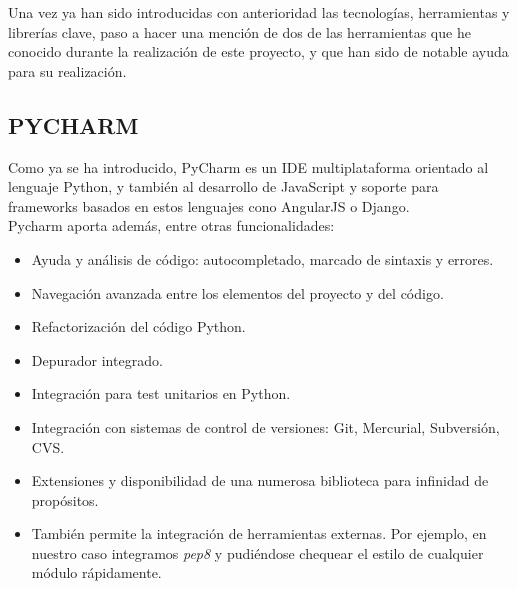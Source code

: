 Una vez ya han sido introducidas con anterioridad las tecnologías, herramientas y librerías clave, paso a hacer una mención de dos de las herramientas que he conocido durante la realización de este proyecto, y que han sido de notable ayuda para su realización.\\

\subsection{PYCHARM}
\label{subsec:pycharm}

Como ya se ha introducido, PyCharm es un IDE multiplataforma orientado al lenguaje Python, y también al desarrollo de JavaScript y soporte para frameworks basados en estos lenguajes cono AngularJS o Django.\\


Pycharm aporta además, entre otras funcionalidades:\\

\begin{itemize}
\item Ayuda y análisis de código: autocompletado, marcado de sintaxis y errores.\\

\item Navegación avanzada entre los elementos del proyecto y del código.\\

\item Refactorización del código Python.\\

\item Depurador integrado.

\item Integración para test unitarios en Python.\\

\item Integración con sistemas de control de versiones: Git, Mercurial, Subversión, CVS.\\

\item Extensiones y disponibilidad de una numerosa biblioteca para infinidad de propósitos.\\

\item También permite la integración de herramientas externas. Por ejemplo, en nuestro caso integramos \textit{pep8} y pudiéndose chequear el estilo de cualquier módulo rápidamente.
\end{itemize}


